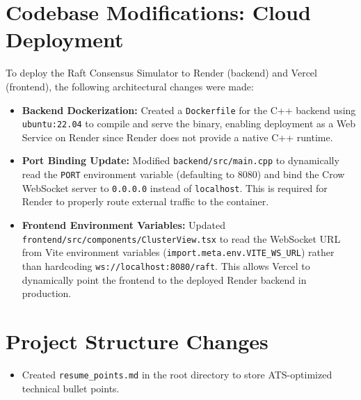 \documentclass[11pt, a4paper]{article}
\begin{document}
\section*{Codebase Modifications: Cloud Deployment}
To deploy the Raft Consensus Simulator to Render (backend) and Vercel (frontend), the following architectural changes were made:
\begin{itemize}
    \item \textbf{Backend Dockerization:} Created a \texttt{Dockerfile} for the C++ backend using \texttt{ubuntu:22.04} to compile and serve the binary, enabling deployment as a Web Service on Render since Render does not provide a native C++ runtime.
    \item \textbf{Port Binding Update:} Modified \texttt{backend/src/main.cpp} to dynamically read the \texttt{PORT} environment variable (defaulting to 8080) and bind the Crow WebSocket server to \texttt{0.0.0.0} instead of \texttt{localhost}. This is required for Render to properly route external traffic to the container.
    \item \textbf{Frontend Environment Variables:} Updated \texttt{frontend/src/components/ClusterView.tsx} to read the WebSocket URL from Vite environment variables (\texttt{import.meta.env.VITE\_WS\_URL}) rather than hardcoding \texttt{ws://localhost:8080/raft}. This allows Vercel to dynamically point the frontend to the deployed Render backend in production.
\end{itemize}

\section*{Project Structure Changes}
\begin{itemize}
    \item Created \texttt{resume\_points.md} in the root directory to store ATS-optimized technical bullet points.
\end{itemize}
\end{document}
